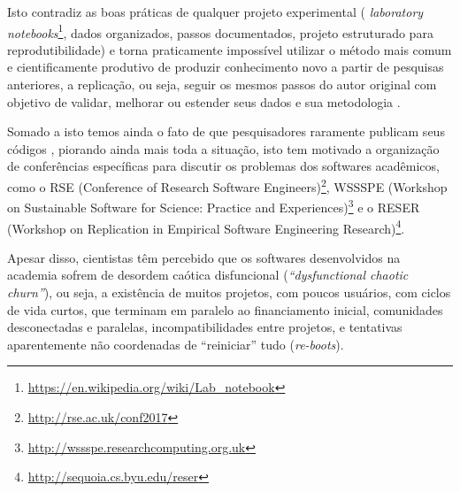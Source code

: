 Isto contradiz as boas práticas de qualquer projeto experimental ({\it
laboratory
notebooks}\footnote{\url{https://en.wikipedia.org/wiki/Lab_notebook}}, dados
organizados, passos documentados, projeto estruturado para reprodutibilidade) e
torna praticamente impossível utilizar o método mais comum e cientificamente
produtivo de produzir conhecimento novo a partir de pesquisas anteriores, a
replicação, ou seja, seguir os mesmos passos do autor original com objetivo de
validar, melhorar ou estender seus dados e sua metodologia
\cite{king1995replication, stodden2010reproducible}.

Somado a isto temos ainda o fato de que pesquisadores raramente publicam seus
códigos \cite{robles2010replicating, amann2015software}, piorando ainda mais toda a situação, isto tem motivado a organização
de conferências específicas para discutir os problemas dos softwares
acadêmicos, como o RSE (Conference of Research Software Engineers)\footnote{
\url{http://rse.ac.uk/conf2017}}, WSSSPE (Workshop on Sustainable Software for
Science: Practice and Experiences)\footnote{
\url{http://wssspe.researchcomputing.org.uk}} e o RESER (Workshop on
Replication in Empirical Software Engineering Research)\footnote{
\url{http://sequoia.cs.byu.edu/reser}}.
%


Apesar disso, cientistas têm percebido que os softwares desenvolvidos na academia 
sofrem de desordem caótica disfuncional ({\it ``dysfunctional chaotic churn''}), 
ou seja, a existência
de muitos projetos, com poucos usuários, com ciclos de vida curtos, que
terminam em paralelo ao financiamento inicial, comunidades desconectadas e
paralelas, incompatibilidades entre projetos, e tentativas aparentemente não
coordenadas de ``reiniciar'' tudo ({\it re-boots}).

